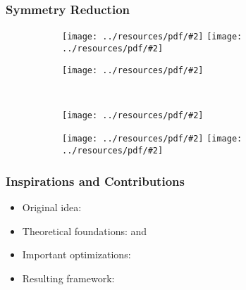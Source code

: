 \documentclass{beamer}
\newcommand{\includeressource}[2][]{\texttt{[image: ../resources/pdf/\#2]}}
\begin{document}
\begin{frame}
  \frametitle{Symmetry Reduction}

  \begin{figure}
    \centering
    \begin{subfigure}{.3\textwidth}
      \begin{overprint}
        \includeressource[width=\textwidth]{%
          regular_mesh_4_4_mapping1_noarrow.pdf}
        \includeressource[width=\textwidth]{%
          regular_mesh_4_4_mapping1.pdf}
      \end{overprint}
    \end{subfigure}
    \hspace*{.5cm}
    \begin{subfigure}{.3\textwidth}
      \includeressource[width=\textwidth]{regular_mesh_4_4_mapping2.pdf}
    \end{subfigure} \\
    \vspace{.5cm}
    \begin{subfigure}{.3\textwidth}
      \includeressource[width=\textwidth]{regular_mesh_4_4_mapping4.pdf}
    \end{subfigure}
    \hspace*{.5cm}
    \begin{subfigure}{.3\textwidth}
      \begin{overprint}
        \includeressource[width=\textwidth]{%
          regular_mesh_4_4_mapping5_noarrow.pdf}
        \includeressource[width=\textwidth]{%
          regular_mesh_4_4_mapping5.pdf}
      \end{overprint}
    \end{subfigure}
  \end{figure}
\end{frame}

\begin{frame}
  \frametitle{Inspirations and Contributions}

  \begin{itemize}
    \item<1-> Original idea: \cite{Goens}
    \item<2-> Theoretical foundations: \cite{Holt} and \cite{Mitchell}
    \item<3-> Important optimizations: \cite{Donaldson}
    \item<4-> Resulting framework: \cite{mpsym}
  \end{itemize}
\end{frame}
\end{document}

